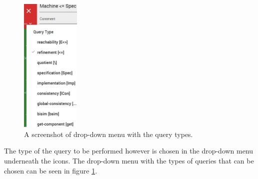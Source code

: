 \begin{figure}[H]
    \centering
    \includegraphics[width=0.25\textwidth]{common/figures/check-type.jpg}
    \caption{A screenshot of drop-down menu with the query types.}
    \label{fig:ECDAR-query-types}
\end{figure}

The type of the query to be performed however is chosen in the drop-down menu underneath the icons. 
The drop-down menu with the types of queries that can be chosen can be seen in figure \ref{fig:ECDAR-query-types}.


